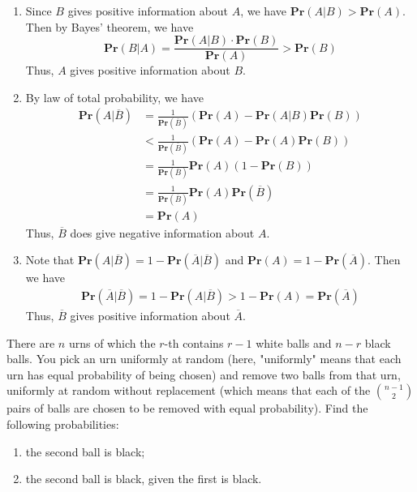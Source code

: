 \documentclass[a4paper, justified]{tufte-handout}
\begin{document}
\begin{solution}
  \begin{enumerate}
    \item Since \(B\) gives positive information about \(A\), we have \(\mathbf{Pr}(A|B) > \mathbf{Pr}(A)\). Then by Bayes' theorem, we have
    \[\mathbf{Pr}(B|A) = \frac{\mathbf{Pr}(A|B) \cdot \mathbf{Pr}(B)}{\mathbf{Pr}(A)} > \mathbf{Pr}(B)\]
    Thus, \(A\) gives positive information about \(B\).
    \item By law of total probability, we have
    \[
    \begin{aligned}
      \mathbf{Pr}(A|\overline{B}) &= \frac{1}{\mathbf{Pr}(\overline{B})}\left(\mathbf{Pr}(A) - \mathbf{Pr}(A|B)\mathbf{Pr}(B)\right)\\
      &< \frac{1}{\mathbf{Pr}(\overline{B})}\left(\mathbf{Pr}(A) - \mathbf{Pr}(A)\mathbf{Pr}(B)\right)\\
      &= \frac{1}{\mathbf{Pr}(\overline{B})}\mathbf{Pr}(A)(1 - \mathbf{Pr}(B))\\
      &= \frac{1}{\mathbf{Pr}(\overline{B})}\mathbf{Pr}(A)\mathbf{Pr}(\overline{B})\\
      &= \mathbf{Pr}(A)
    \end{aligned}
    \]
    Thus, \(\overline{B}\) does give negative information about \(A\).
    \item Note that \(\mathbf{Pr}(A|\overline{B}) = 1 - \mathbf{Pr}(\overline{A}|\overline{B})\) and \(\mathbf{Pr}(A) = 1 - \mathbf{Pr}(\overline{A})\). Then we have
    \[
    \begin{aligned}
      \mathbf{Pr}(\overline{A}|\overline{B}) = 1 - \mathbf{Pr}(A|\overline{B}) > 1 - \mathbf{Pr}(A) = \mathbf{Pr}(\overline{A})
    \end{aligned}
    \]
    Thus, \(\overline{B}\) gives positive information about \(\overline{A}\).
  \end{enumerate}
\end{solution}

\begin{problem}
  There are $n$ urns of which the $r$-th contains $r-1$ white balls and $n-r$ black balls. You pick an urn uniformly at random (here, "uniformly" means that each urn has equal probability of being chosen) and remove two balls from that urn, uniformly at random without replacement (which means that each of the $\binom{n-1}{2}$ pairs of balls are chosen to be removed with equal probability). Find the following probabilities:
  \begin{enumerate}
    \item the second ball is black;
    \item the second ball is black, given the first is black.
  \end{enumerate}
\end{problem}
\end{document}
